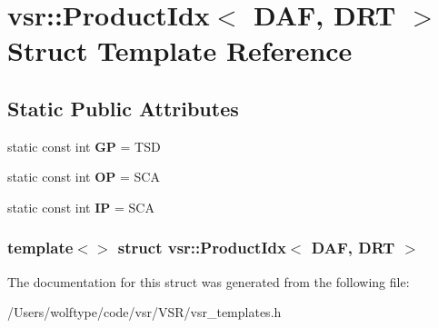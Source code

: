 \hypertarget{structvsr_1_1_product_idx_3_01_d_a_f_00_01_d_r_t_01_4}{\section{vsr\-:\-:Product\-Idx$<$ D\-A\-F, D\-R\-T $>$ Struct Template Reference}
\label{structvsr_1_1_product_idx_3_01_d_a_f_00_01_d_r_t_01_4}
}
\subsection*{Static Public Attributes}
\begin{DoxyCompactItemize}
\item 
\hypertarget{structvsr_1_1_product_idx_3_01_d_a_f_00_01_d_r_t_01_4_af826049a33e9f34940c245d5ce912829}{static const int {\bfseries G\-P} = T\-S\-D}\label{structvsr_1_1_product_idx_3_01_d_a_f_00_01_d_r_t_01_4_af826049a33e9f34940c245d5ce912829}

\item 
\hypertarget{structvsr_1_1_product_idx_3_01_d_a_f_00_01_d_r_t_01_4_a47b14873ec74da0240cfcb28504e46a3}{static const int {\bfseries O\-P} = S\-C\-A}\label{structvsr_1_1_product_idx_3_01_d_a_f_00_01_d_r_t_01_4_a47b14873ec74da0240cfcb28504e46a3}

\item 
\hypertarget{structvsr_1_1_product_idx_3_01_d_a_f_00_01_d_r_t_01_4_a52730f6e1348e325b54dbb5aa720bad2}{static const int {\bfseries I\-P} = S\-C\-A}\label{structvsr_1_1_product_idx_3_01_d_a_f_00_01_d_r_t_01_4_a52730f6e1348e325b54dbb5aa720bad2}

\end{DoxyCompactItemize}
\subsubsection*{template$<$$>$ struct vsr\-::\-Product\-Idx$<$ D\-A\-F, D\-R\-T $>$}



The documentation for this struct was generated from the following file\-:\begin{DoxyCompactItemize}
\item 
/\-Users/wolftype/code/vsr/\-V\-S\-R/vsr\-\_\-templates.\-h\end{DoxyCompactItemize}
